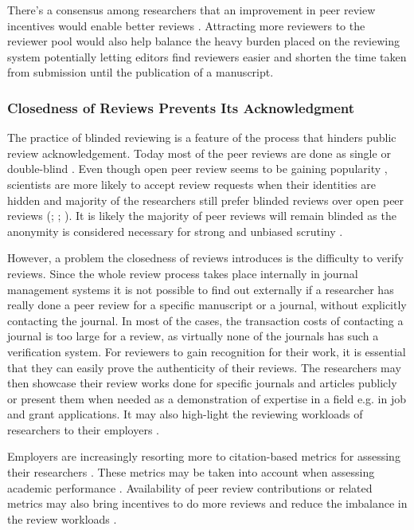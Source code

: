 There’s a consensus among researchers that an improvement in peer review incentives would enable better reviews \parencite{Publons.2018}. Attracting more reviewers to the reviewer pool would also help balance the heavy burden placed on the reviewing system potentially letting editors find reviewers easier and shorten the time taken from submission until the publication of a manuscript. 

\subsubsection{Closedness of Reviews Prevents Its Acknowledgment}

The practice of blinded reviewing is a feature of the process that hinders public review acknowledgement. Today most of the peer reviews are done as single or double-blind \parencite{Wolfram.2020}. Even though open peer review seems to be gaining popularity \parencite{Wolfram.2020}, scientists are more likely to accept review requests when their identities are hidden \parencite{vanRooyen.1999} and majority of the researchers still prefer blinded reviews over open peer reviews (\cite[149]{Mulligan.2013}; \cite{Taylor&Francis.2015}; \cite[1038-1039]{Wolfram.2020}). It is likely the majority of peer reviews will remain blinded as the anonymity is considered necessary for strong and unbiased scrutiny \parencite[21-23]{RossHellauer.2017}.

However, a problem the closedness of reviews introduces is the difficulty to verify reviews. Since the whole review process takes place internally in journal management systems it is not possible to find out externally if a researcher has really done a peer review for a specific manuscript or a journal, without explicitly contacting the journal. In most of the cases, the transaction costs of contacting a journal is too large for a review, as virtually none of the journals has such a verification system. For reviewers to gain recognition for their work, it is essential that they can easily prove the authenticity of their reviews. The researchers may then showcase their review works done for specific journals and articles publicly or present them when needed as a demonstration of expertise in a field e.g. in job and grant applications. It may also high-light the reviewing workloads of researchers to their employers \parencite[2]{Raoult.2020}. 

Employers are increasingly resorting more to citation-based metrics for assessing their researchers \parencite{Bianchi.2019, Cantor.2015, Kachewar.2013, Verissimo.2013}. These metrics may be taken into account when assessing academic performance \parencite[11]{Ferreira.2016}. Availability of peer review contributions or related metrics may also bring incentives to do more reviews and reduce the imbalance in the review workloads \parencite[4]{Petchey.2014}. 

